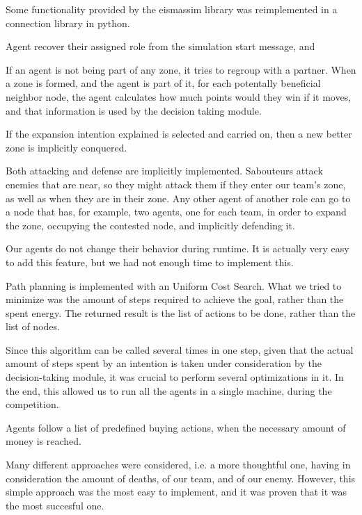 \documentclass{llncs2e/llncs}
\begin{document}
    Some functionality provided by the eismassim library was reimplemented in a 
    connection library in python.

    Agent recover their assigned role from the simulation start message, and 

    If an agent is not being part of any zone, it tries to regroup with a partner. 
    When a zone is formed, and the agent is part of it, for each potentally 
    beneficial neighbor node, the agent calculates how much points would they win 
    if it moves, and that information is used by the decision taking module.

    If the expansion intention explained is selected and carried on, then a new 
    better zone is implicitly conquered.

    Both attacking and defense are implicitly implemented. Sabouteurs attack 
    enemies that are near, so they might attack them if they enter our team's 
    zone, as well as when they are in their zone. Any other agent of another role
    can go to a node that has, for example, two agents, one for each team, in order
    to expand the zone, occupying the contested node, and implicitly defending it.
    

    Our agents do not change their behavior during runtime. It is actually very 
    easy to add this feature, but we had not enough time to implement this.

    Path planning is implemented with an Uniform Cost Search. What we tried to 
    minimize was the amount of steps required to achieve the goal, rather than the 
    spent energy. The returned result is the list of actions to be done, rather 
    than the list of nodes.
    
    Since this algorithm can be called several times in one step, given that the 
    actual amount of steps spent by an intention is taken under consideration by 
    the decision-taking module, it was crucial to perform several optimizations in 
    it. In the end, this allowed us to run all the agents in a single machine, 
    during the competition.

    Agents follow a list of predefined buying actions, when the necessary amount 
    of money is reached.
    
    Many different approaches were considered, i.e. a more thoughtful one, having 
    in consideration the amount of deaths, of our team, and of our enemy. However,
    this simple approach was the most easy to implement, and it was proven that it
    was the most succesful one.
\end{document}
